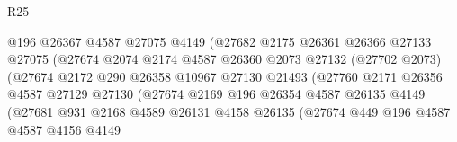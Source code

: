 \begin{lexlean}{R25}
\begin{coremodule}
                                    @196
                                    @26367
                                    @4587
                                    @27075
                                    @4149
                                    (@27682
                                      @2175
                                      @26361
                                      @26366
                                      @27133
                                      @27075
                                      (@27674
                                        @2074
                                        @2174
                                        @4587
                                        @26360
                                        @2073
                                        @27132
                                        (@27702 @2073)
                                        (@27674
                                          @2172
                                          @290
                                          @26358
                                          @10967
                                          @27130
                                          @21493
                                          (@27760
                                            @2171
                                            @26356
                                            @4587
                                            @27129
                                            @27130
                                            (@27674
                                              @2169
                                              @196
                                              @26354
                                              @4587
                                              @26135
                                              @4149
                                              (@27681
                                                @931
                                                @2168
                                                @4589
                                                @26131
                                                @4158
                                                @26135
                                                (@27674
                                                  @449
                                                  @196
                                                  @4587
                                                  @4587
                                                  @4156
                                                  @4149

\end{coremodule}
\end{lexlean}
